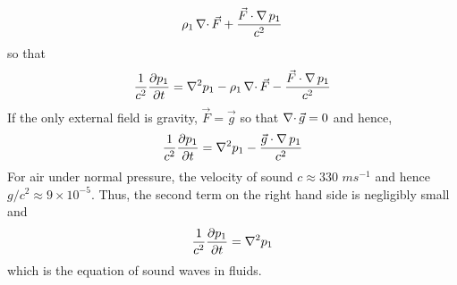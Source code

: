 \begin{itemize}
\[\rho_1\operatorname{\nabla\cdot}\vec{F} + \frac{\vec{F}\cdot\operatorname{\nabla} p_1}{c^2}
\]
so that
\begin{equation}\label{c3s6e13}
\frac{1}{c^2}\frac{\partial{p_1}}{\partial{t}} = \nabla^2 p_1 - \rho_1\operatorname{\nabla\cdot}\vec{F} - \frac{\vec{F}\cdot\operatorname{\nabla} p_1}{c^2}
\end{equation}
If the only external field is gravity, $\vec{F} = \vec{g}$ so that $\operatorname{\nabla\cdot}{\vec{g}} = 0$ and hence,
\[
\frac{1}{c^2}\frac{\partial{p_1}}{\partial{t}} = \nabla^2 p_1 - \frac{\vec{g}\cdot\operatorname{\nabla} p_1}{c^2}
\]
For air under normal pressure, the velocity of sound $c \approx 330$ $ms^{-1}$ and hence $g/c^2 \approx 9 \times 10^{-5}$. Thus, the second term on the right hand side is negligibly
small and 
\begin{equation}\label{c3e6e14}
\frac{1}{c^2}\frac{\partial{p_1}}{\partial{t}} = \nabla^2 p_1
\end{equation}
which is the equation of sound waves in fluids.
\end{itemize}

